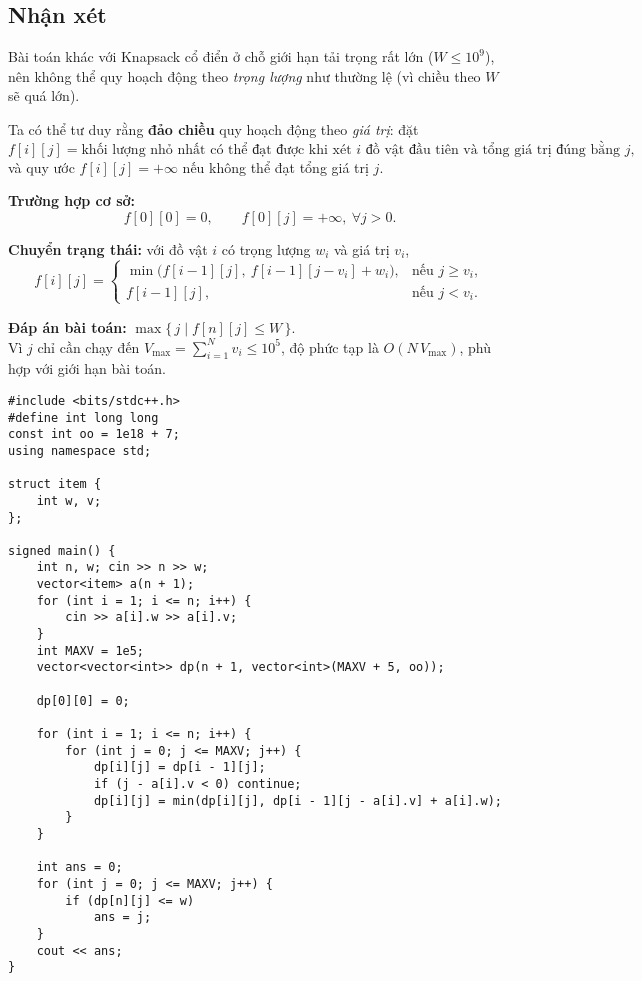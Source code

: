 \subsection{Nhận xét}

Bài toán khác với Knapsack cổ điển ở chỗ giới hạn tải trọng rất lớn ($W \le 10^9$), nên không thể quy hoạch động theo \emph{trọng lượng} như thường lệ (vì chiều theo $W$ sẽ quá lớn).

Ta có thể tư duy rằng \textbf{đảo chiều} quy hoạch động theo \emph{giá trị}: đặt
\[
f[i][j] = \text{khối lượng nhỏ nhất có thể đạt được khi xét } i \text{ đồ vật đầu tiên và tổng giá trị đúng bằng } j,
\]
và quy ước $f[i][j]=+\infty$ nếu không thể đạt tổng giá trị $j$.

\textbf{Trường hợp cơ sở:}
\[
f[0][0] = 0,\qquad f[0][j] = +\infty, \ \forall j>0.
\]

\textbf{Chuyển trạng thái:} với đồ vật $i$ có trọng lượng $w_i$ và giá trị $v_i$,
\[
f[i][j] =
\begin{cases}
\min\big(f[i-1][j],\ f[i-1][j - v_i] + w_i\big), & \text{nếu } j \ge v_i,\\[4pt]
f[i-1][j], & \text{nếu } j < v_i.
\end{cases}
\]

\textbf{Đáp án bài toán:} $\max \{\, j \mid f[n][j] \le W \,\}.$\\


Vì $j$ chỉ cần chạy đến $V_{\max}=\sum_{i=1}^N v_i \le 10^5$, độ phức tạp là $O(N\,V_{\max})$, phù hợp  với giới hạn bài toán. 

\begin{lstlisting}[title=\centering \textbf{Cài đặt}]
#include <bits/stdc++.h>
#define int long long
const int oo = 1e18 + 7;
using namespace std;

struct item {
    int w, v;
};

signed main() {
    int n, w; cin >> n >> w;
    vector<item> a(n + 1);
    for (int i = 1; i <= n; i++) {
        cin >> a[i].w >> a[i].v;
    }    
    int MAXV = 1e5;
    vector<vector<int>> dp(n + 1, vector<int>(MAXV + 5, oo));

    dp[0][0] = 0;

    for (int i = 1; i <= n; i++) {
        for (int j = 0; j <= MAXV; j++) {
            dp[i][j] = dp[i - 1][j];
            if (j - a[i].v < 0) continue;
            dp[i][j] = min(dp[i][j], dp[i - 1][j - a[i].v] + a[i].w);
        }
    }

    int ans = 0;
    for (int j = 0; j <= MAXV; j++) {
        if (dp[n][j] <= w)
            ans = j;
    }
    cout << ans;
}
\end{lstlisting}



